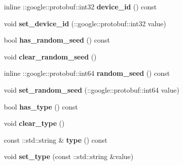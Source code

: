 \begin{DoxyCompactItemize}
\mbox{\label{classcaffe_1_1_solver_parameter_ad1d728bab8cbd3df22e65d19a062d7ec}} 
inline \+::google\+::protobuf\+::int32 {\bfseries device\+\_\+id} () const
\item 
\mbox{\label{classcaffe_1_1_solver_parameter_ade8967628844768eee0dba7fbdc9137c}} 
void {\bfseries set\+\_\+device\+\_\+id} (\+::google\+::protobuf\+::int32 value)
\item 
\mbox{\label{classcaffe_1_1_solver_parameter_a6536f2e7d2fd9758268b71bfae5d0add}} 
bool {\bfseries has\+\_\+random\+\_\+seed} () const
\item 
\mbox{\label{classcaffe_1_1_solver_parameter_a014f6e9f5b73d0192b151cd63b22d8d1}} 
void {\bfseries clear\+\_\+random\+\_\+seed} ()
\item 
\mbox{\label{classcaffe_1_1_solver_parameter_a23b8f4b15e800d2cda0bc78cdc10e9a7}} 
inline \+::google\+::protobuf\+::int64 {\bfseries random\+\_\+seed} () const
\item 
\mbox{\label{classcaffe_1_1_solver_parameter_a8ccb50c841cefd76141ba81f38dd0b05}} 
void {\bfseries set\+\_\+random\+\_\+seed} (\+::google\+::protobuf\+::int64 value)
\item 
\mbox{\label{classcaffe_1_1_solver_parameter_aa619ecd344a23debf4e396a50304bea5}} 
bool {\bfseries has\+\_\+type} () const
\item 
\mbox{\label{classcaffe_1_1_solver_parameter_ae1dba9c733d2207988246a56b84e9f3e}} 
void {\bfseries clear\+\_\+type} ()
\item 
\mbox{\label{classcaffe_1_1_solver_parameter_ac505eaaa938e70c335ad87e4937bc54a}} 
const \+::std\+::string \& {\bfseries type} () const
\item 
\mbox{\label{classcaffe_1_1_solver_parameter_a8cc17f2f259fe150e09200b0f00c5bf9}} 
void {\bfseries set\+\_\+type} (const \+::std\+::string \&value)

\end{DoxyCompactItemize}
